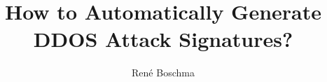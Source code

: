 \documentclass{libs/sig-alternate}
\begin{document}
\title{How to Automatically Generate DDOS Attack Signatures?}

\author{
\alignauthor
	René Boschma\\
    \\
}


\maketitle


	

%


%



\newpage

\end{document}
